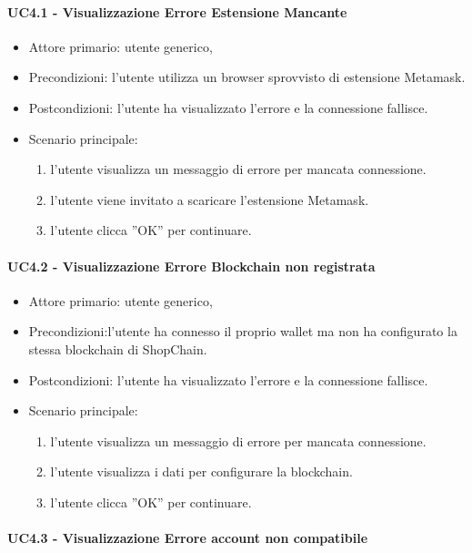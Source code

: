\paragraph{UC4.1 - Visualizzazione Errore Estensione Mancante}

\begin{itemize}
    \item Attore primario: utente generico,
    \item Precondizioni: l'utente utilizza un browser sprovvisto di estensione Metamask.
    \item Postcondizioni: l'utente ha visualizzato l'errore e la connessione fallisce.
    \item Scenario principale: \begin{enumerate}
        \item l'utente visualizza un messaggio di errore per mancata connessione.
        \item l'utente viene invitato a scaricare l'estensione Metamask.
        \item l’utente clicca ”OK” per continuare.
    \end{enumerate}
\end{itemize}

\paragraph{UC4.2 - Visualizzazione Errore Blockchain non registrata}

\begin{itemize}
    \item Attore primario: utente generico,
    \item Precondizioni:l'utente ha connesso il proprio wallet ma non ha configurato la stessa blockchain di ShopChain.
    \item Postcondizioni: l'utente ha visualizzato l'errore e la connessione fallisce.
    \item Scenario principale: \begin{enumerate}
        \item l'utente visualizza un messaggio di errore per mancata connessione.
        \item l'utente visualizza i dati per configurare la blockchain.
        \item l’utente clicca ”OK” per continuare.
    \end{enumerate}
\end{itemize}

\paragraph{UC4.3 - Visualizzazione Errore account non compatibile}

